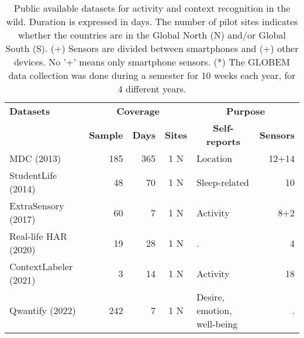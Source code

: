 \begin{table}[btp]
\caption{\label{tab:relatedwork} Public available datasets for activity and context recognition in the wild. Duration is expressed in days. The number of pilot sites indicates whether the countries are in the Global North (N) and/or Global South (S). (+) Sensors are divided between smartphones and (+) other devices. No '+' means only smartphone sensors. (*) The GLOBEM data collection was done during a semester for 10 weeks each year, for 4 different years.}
\begin{tabularx}{\textwidth}{lrrcXr}
\toprule
\textbf{Datasets}%
& \multicolumn{3}{c}{\textbf{Coverage}}%
& \multicolumn{2}{c}{\textbf{Purpose}}\\  
\cmidrule(rl){2-4}\cmidrule(rl){5-6}
 & \multicolumn{1}{c}{\textbf{Sample}}         & \multicolumn{1}{c}{\textbf{Days}} & \multicolumn{1}{c}{\textbf{Sites}} & \multicolumn{1}{c}{\textbf{Self-reports}}                          & \multicolumn{1}{c}{\textbf{Sensors}}   \\
\midrule
MDC (2013)   \cite{laurila2013}               & 185                      & 365                      & 1 N                 & Location   
                                        & 12+14                     \\
StudentLife  (2014)  \cite{wang2014studentlife}          & 48                      & 70                      & 1 N                 & Sleep-related                                 & 10                    \\
ExtraSensory  (2017)  \cite{vaizman2017recognizing}      & 60                      & 7                       & 1 N                & Activity                                      & 8+2                 \\
Real-life HAR  (2020)  \cite{gonzalez2020}               & 19                      & 28                      & 1 N                &  .                                            & 4                     \\
ContextLabeler  (2021)  \cite{campana2021contextlabeler} & 3                       & 14                      & 1 N                 & Activity                                      & 18                    \\
Qwantify  (2022)   \cite{wilson2022qwantify}          & 242                     & 7   & 1 N                & Desire, emotion,    well-being                & . \\

\end{tabularx}
\end{table}
